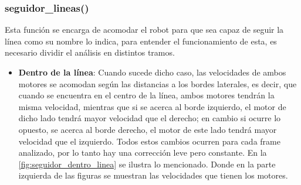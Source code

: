 \documentclass[11pt,a4paper]{article}
\begin{document}
	\subsubsection{seguidor\_lineas()}
	
	Esta función se encarga de acomodar el robot para que sea capaz de seguir la línea como su nombre lo indica, para entender el funcionamiento de esta, es necesario dividir el análisis en distintos tramos.
	
	\begin{itemize}
		\item \textbf{Dentro de la línea}: Cuando sucede dicho caso, las velocidades de ambos motores se acomodan según las distancias a los bordes laterales, es decir, que cuando se encuentra en el centro de la línea, ambos motores tendrán la misma velocidad, mientras que si se acerca al borde izquierdo, el motor de dicho lado tendrá mayor velocidad que el derecho; en cambio si ocurre lo opuesto, se acerca al borde derecho, el motor de este lado tendrá mayor velocidad que el izquierdo. Todos estos cambios ocurren para cada frame analizado, por lo tanto hay una corrección leve pero constante. En la \autoref*{fig:seguidor_dentro_linea} se ilustra lo mencionado. Donde en la parte izquierda de las figuras se muestran las velocidades que tienen los motores.
		

\end{itemize}
\end{document}
